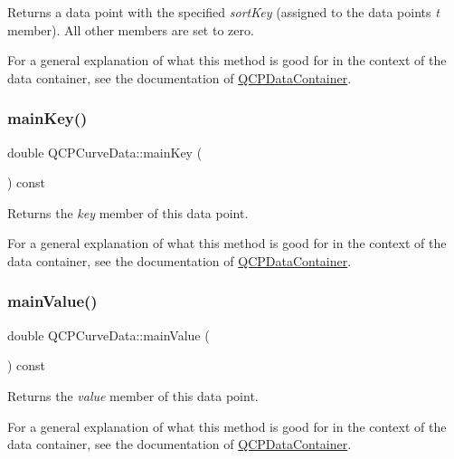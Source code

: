Returns a data point with the specified {\itshape sort\+Key} (assigned to the data point\textquotesingle{}s {\itshape t} member). All other members are set to zero.

For a general explanation of what this method is good for in the context of the data container, see the documentation of \mbox{\hyperlink{class_q_c_p_data_container}{Q\+C\+P\+Data\+Container}}. \mbox{\label{class_q_c_p_curve_data_ac805ffc8b4207652efb9fcc6a2cdd3e8}} 
\subsubsection{\texorpdfstring{mainKey()}{mainKey()}}
{\footnotesize\ttfamily double Q\+C\+P\+Curve\+Data\+::main\+Key (\begin{DoxyParamCaption}{ }\end{DoxyParamCaption}) const\hspace{0.3cm}{\ttfamily [inline]}}

Returns the {\itshape key} member of this data point.

For a general explanation of what this method is good for in the context of the data container, see the documentation of \mbox{\hyperlink{class_q_c_p_data_container}{Q\+C\+P\+Data\+Container}}. \mbox{\label{class_q_c_p_curve_data_a39a94131e5f62f16b256bcf8c47a3205}} 
\subsubsection{\texorpdfstring{mainValue()}{mainValue()}}
{\footnotesize\ttfamily double Q\+C\+P\+Curve\+Data\+::main\+Value (\begin{DoxyParamCaption}{ }\end{DoxyParamCaption}) const\hspace{0.3cm}{\ttfamily [inline]}}

Returns the {\itshape value} member of this data point.

For a general explanation of what this method is good for in the context of the data container, see the documentation of \mbox{\hyperlink{class_q_c_p_data_container}{Q\+C\+P\+Data\+Container}}. \mbox{\label{class_q_c_p_curve_data_a583174f2b68e01b4d545f04571f58bd0}} 
